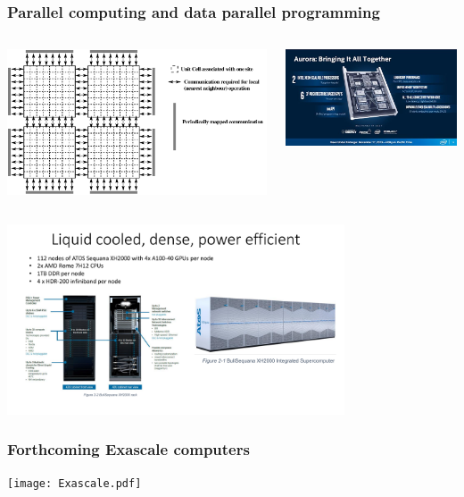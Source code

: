 \documentclass[pdf,ps,8pt]{beamer}
\begin{document}
\begin{frame}[fragile]\small\frametitle{ Parallel computing and data parallel programming}

\begin{columns}
\begin{column}{0.5\textwidth}
  \includegraphics[width=.5\textwidth]{noparitygeom1.pdf}
\end{column}
\begin{column}{0.5\textwidth}
  \includegraphics[width=\textwidth]{Aurora.jpeg}
\end{column}
\end{columns}
\begin{center}
  \includegraphics[width=0.75\textwidth]{TursaSystem.pdf}
\end{center}
\end{frame}

\begin{frame}[fragile]\small\frametitle{ Forthcoming Exascale computers}
\texttt{[image: Exascale.pdf]}
\end{frame}
\end{document}
